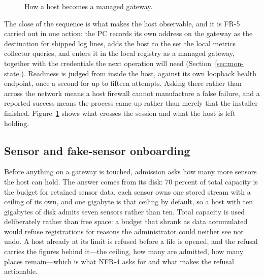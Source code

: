 \documentclass[12pt,a4paper]{report}
\begin{document}
\begin{figure}[htbp]
{%
}
\caption{How a host becomes a managed gateway.}
\label{fig:mon-install-flow}
\end{figure}

The close of the sequence is what makes the host observable, and it is
FR-5 carried out in one action: the PC records its own address on the
gateway as the destination for shipped log lines, adds the host to the
set the local metrics collector queries, and enters it in the local
registry as a managed gateway, together with the credentials the next
operation will need (Section~\ref{sec:mon-state}). Readiness is judged
from inside the host, against its own loopback health endpoint, once a
second for up to fifteen attempts. Asking there rather than across the
network means a host firewall cannot manufacture a false failure, and a
reported success means the process came up rather than merely that the
installer finished. Figure~\ref{fig:mon-install-flow} shows what crosses
the session and what the host is left holding.

\subsection{Sensor and fake-sensor onboarding}
\label{sec:monitoring-fakes}

Before anything on a gateway is touched, admission asks how many more
sensors the host can hold. The answer comes from its disk: 70 percent
of total capacity is the budget for retained sensor data, each sensor
owns one stored stream with a ceiling of its own, and one gigabyte is
that ceiling by default, so a host with ten gigabytes of disk admits
seven sensors rather than ten. Total capacity is used deliberately
rather than free space: a budget that shrank as data accumulated would
refuse registrations for reasons the administrator could neither see
nor undo. A host already at its limit is refused before a file is
opened, and the refusal carries the figures behind it---the ceiling,
how many are admitted, how many places remain---which is what NFR-4
asks for and what makes the refusal actionable.
\end{document}
